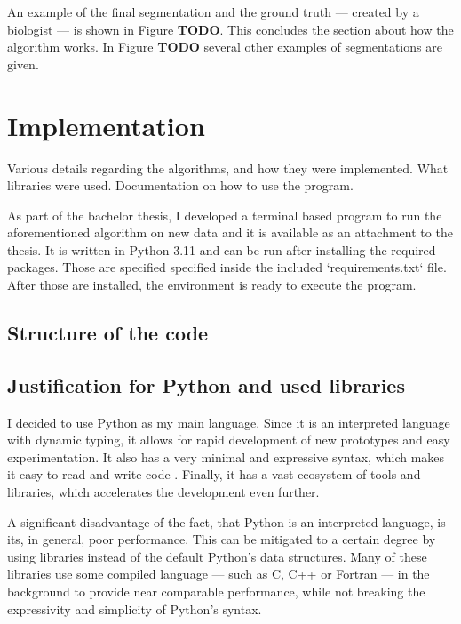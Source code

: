 \documentclass[
  digital,     %
  oneside,     %
  nosansbold,  %
  nocolorbold, %
  lof,         %
  lot,         %
]{fithesis4}
\begin{document}
An example of the final segmentation and the ground truth --- created by a
biologist --- is shown in Figure \textbf{TODO}. This concludes the section about
how the algorithm works. In Figure \textbf{TODO} several other examples of
segmentations are given.


\chapter{Implementation}

Various details regarding the algorithms, and how they were implemented. What
libraries were used. Documentation on how to use the program.

As part of the bachelor thesis, I developed a terminal based program to run the
aforementioned algorithm on new data and it is available as an attachment to the
thesis. It is written in Python 3.11 and can be run after installing the
required packages. Those are specified specified inside the included
`requirements.txt` file. After those are installed, the environment is ready to
execute the program.


\section{Structure of the code}

\section{Justification for Python and used libraries}
I decided to use Python as my main language. Since it is an interpreted language
with dynamic typing, it allows for rapid development of new prototypes and easy
experimentation. It also has a very minimal and expressive syntax, which makes
it easy to read and write code \cite{python-docs-tutorial}. Finally, it has a
vast ecosystem of tools and libraries, which accelerates the development even
further. 

A significant disadvantage of the fact, that Python is an interpreted language,
is its, in general, poor performance. This can be mitigated to a certain degree
by using libraries instead of the default Python's data structures. Many of
these libraries use some compiled language --- such as C, C++ or Fortran --- in
the background to provide near comparable performance, while not breaking
the expressivity and simplicity of Python's syntax.
\end{document}
